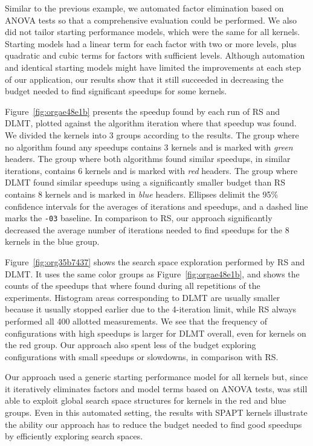 \documentclass[conference]{IEEEtran}
\begin{document}
Similar to the previous example, we automated factor elimination based on ANOVA
tests so that a comprehensive evaluation could be performed. We also did not
tailor starting performance models, which were the same for all kernels.
Starting models had a linear term for each factor with two or more levels, plus
quadratic and cubic terms for factors with sufficient levels. Although
automation and identical starting models might have limited the improvements at
each step of our application, our results show that it still succeeded in
decreasing the budget needed to find significant speedups for some kernels.

Figure~\ref{fig:orgae48e1b} presents the speedup found by each
run of RS and DLMT, plotted against the algorithm iteration where that speedup
was found. We divided the kernels into 3 groups according to the results. The
group where no algorithm found any speedups contains 3 kernels and is marked
with \emph{green} headers. The group where both algorithms found similar speedups, in
similar iterations, contains 6 kernels and is marked with \emph{red} headers. The
group where DLMT found similar speedups using a significantly smaller budget
than RS contains 8 kernels and is marked in \emph{blue} headers. Ellipses delimit the
95\% confidence intervals for the averages of iterations and speedups, and a
dashed line marks the \texttt{-03} baseline. In comparison to RS, our approach
significantly decreased the average number of iterations needed to find speedups
for the 8 kernels in the blue group.

Figure~\ref{fig:org35b7437} shows the search space exploration performed
by RS and DLMT. It uses the same color groups as
Figure~\ref{fig:orgae48e1b}, and shows the counts of the speedups
that where found during all repetitions of the experiments. Histogram areas
corresponding to DLMT are usually smaller because it usually stopped earlier due
to the 4-iteration limit, while RS always performed all 400 allotted
measurements. We see that the frequency of configurations with high speedups is
larger for DLMT overall, even for kernels on the red group. Our approach also
spent less of the budget exploring configurations with small speedups or
slowdowns, in comparison with RS.

Our approach used a generic starting performance model for all kernels but,
since it iteratively eliminates factors and model terms based on ANOVA tests,
was still able to exploit global search space structures for kernels in the red
and blue groups. Even in this automated setting, the results with SPAPT kernels
illustrate the ability our approach has to reduce the budget needed to find good
speedups by efficiently exploring search spaces.
\end{document}
